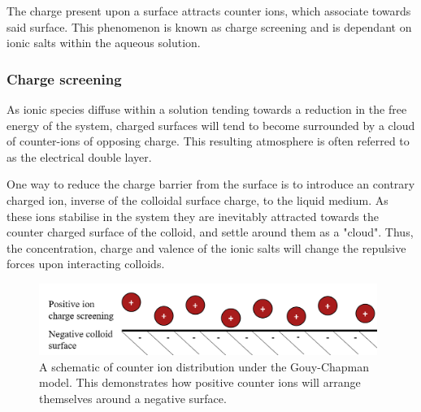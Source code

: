 The charge present upon a surface attracts counter ions, which associate towards said surface. This phenomenon is known as charge screening and is dependant on ionic salts within the aqueous solution.
\cite{babthes}%

\subsubsection{Charge screening}


As %
ionic species diffuse %
within a solution %
tending towards a %
reduction in the free energy of the system, %
charged surfaces will tend to become surrounded by a cloud of counter-ions of opposing charge. %
This resulting atmosphere is often referred to as the electrical double layer. %

One way to reduce the charge barrier from the surface is to introduce an contrary charged ion, inverse of the colloidal surface charge, to the liquid medium. As these ions stabilise in the system they are inevitably attracted towards the counter charged surface of the colloid, and settle around them as a "cloud". Thus, the concentration, charge and valence of the ionic salts will change the repulsive forces upon interacting colloids.\cite{?} 

\begin{figure}[h]    
        \begin{center}
          \includegraphics[width=110mm]{chapter1/ioncloud.PNG}
\end{center}
\caption{A schematic of counter ion distribution under the Gouy-Chapman model. This demonstrates how positive counter ions will arrange themselves around a negative surface.}
\label{fig:ioncloud}                
\end{figure}

